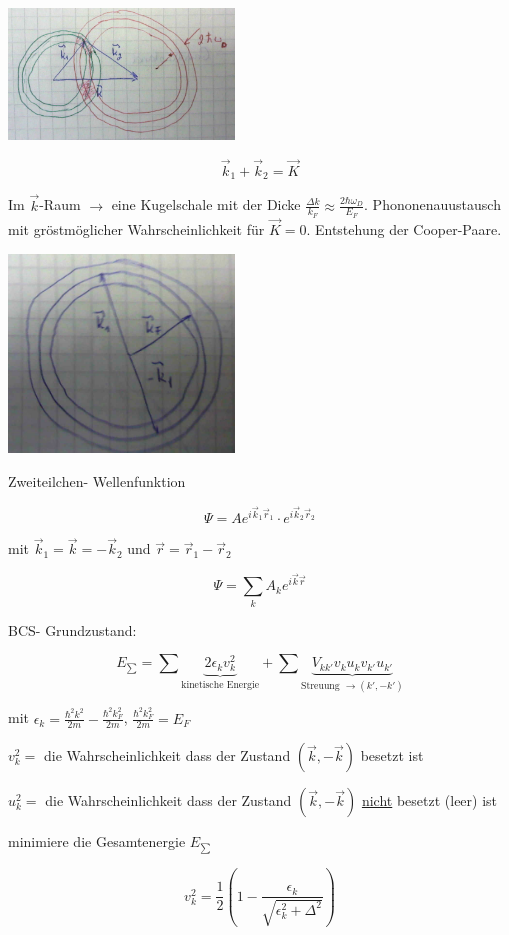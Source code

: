 \includegraphics[width=0.45\textwidth]{kap13_13.png}

\[\vec k_1+\vec k_2 = \vec K\]

Im \(\vec k\)-Raum \(\rightarrow \) eine Kugelschale mit der Dicke \(\frac{\Delta k}{k_F}\approx \frac{2\hbar\omega_D}{E_F}\). Phononenauustausch mit gröstmöglicher Wahrscheinlichkeit für \(\vec K =0 \). Entstehung der Cooper-Paare.

\includegraphics[width=0.45\textwidth]{kap13_14.png}


Zweiteilchen- Wellenfunktion

\[\Psi = A e^{i\vec k_1\vec r_1}\cdot e^{i\vec k_2\vec r_2}   \]

mit \(\vec k_1 = \vec k = -\vec k_2\) und \(\vec r = \vec r_1-\vec r_2\)

\[ \Psi = \sum_k A_k e^{i\vec k\vec r}\]

BCS- Grundzustand:

\[E_{\sum} = \sum \underbrace{2\epsilon_k v_k^2}_{\text{kinetische Energie}}+\sum \underbrace{V_{kk'}v_ku_kv_{k'}u_{k'}}_{\text{Streuung }\rightarrow (k',-k')}\]

mit \(\epsilon_k = \frac{\hbar^2k^2}{2m}-\frac{\hbar^2k^2_F}{2m}\), \(\frac{\hbar^2k^2_F}{2m} = E_F\)

\(v_k^2 =\) die Wahrscheinlichkeit dass der Zustand \((\vec k,-\vec k)\) besetzt ist

\(u_k^2 =\) die Wahrscheinlichkeit dass der Zustand \((\vec k,-\vec k)\) \underline{nicht} besetzt (leer) ist


minimiere die Gesamtenergie \(E_{\sum}\)

\[v^2_k = \frac{1}{2}(1-\frac{\epsilon_k}{\sqrt{\epsilon^2_k+\Delta^2}})\]

